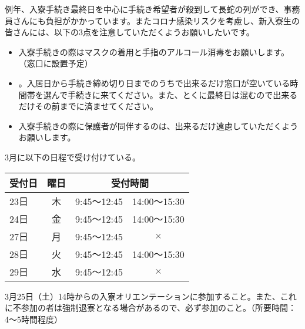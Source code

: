 		例年、入寮手続き最終日を中心に手続き希望者が殺到して長蛇の列ができ、事務員さんにも負担がかかっています。またコロナ感染リスクを考慮し、新入寮生の皆さんには、以下の3点を注意していただくようお願いしたいです。
		\begin{itemize}
		    \item 入寮手続きの際はマスクの着用と手指のアルコール消毒をお願いします。（窓口に設置予定）
		    \item {}。入居日から手続き締め切り日までのうちで出来るだけ窓口が空いている時間帯を選んで手続きに来てください。また、とくに最終日は混むので出来るだけその前までに済ませてください。
		    \item 入寮手続きの際に保護者が同伴するのは、出来るだけ遠慮していただくようお願いします。
		\end{itemize}
        
  3月に以下の日程で受け付けている。%
\begin{table}[h]
  \begin{tabular}{|l|c|c|c|}
    \hline
    受付日 & 曜日  & \multicolumn{2}{|c|}{受付時間}                  \\ \hline \hline
    23日 & 木 & 9:45〜12:45 & 14:00〜15:30 \\ \hline
    24日 & 金 & 9:45〜12:45 & 14:00〜15:30 \\ \hline
    27日 & 月 & 9:45〜12:45 & $ \times $   \\ \hline
    28日 & 火 & 9:45〜12:45 & 14:00〜15:30 \\ \hline
    29日 & 水 & 9:45〜12:45 & $ \times $  \\
     \hline
  \end{tabular}
\end{table}

	3月25日（土）14時からの入寮オリエンテーションに参加すること。また、これに不参加の者は強制退寮となる場合があるので、必ず参加のこと。（所要時間：4〜5時間程度）